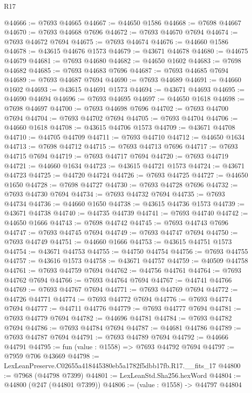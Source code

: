 \begin{lexlean}{R17}
\begin{coremodule}
@44666 := @7693 @44665
@44667 := @44650 @1586
@44668 := @7698 @44667
@44670 := @7693 @44668 @7696
@44672 := @7693 @44670 @7694
@44674 := @7693 @44672 @7694
@44675 := @7693 @44674
@44676 := @44660 @1586
@44678 := @43615 @44676 @1573
@44679 := @43671 @44678
@44680 := @44675 @44679
@44681 := @7693 @44680
@44682 := @44650 @1602
@44683 := @7698 @44682
@44685 := @7693 @44683 @7696
@44687 := @7693 @44685 @7694
@44689 := @7693 @44687 @7694
@44690 := @7693 @44689
@44691 := @44660 @1602
@44693 := @43615 @44691 @1573
@44694 := @43671 @44693
@44695 := @44690 @44694
@44696 := @7693 @44695
@44697 := @44650 @1618
@44698 := @7698 @44697
@44700 := @7693 @44698 @7696
@44702 := @7693 @44700 @7694
@44704 := @7693 @44702 @7694
@44705 := @7693 @44704
@44706 := @44660 @1618
@44708 := @43615 @44706 @1573
@44709 := @43671 @44708
@44710 := @44705 @44709
@44711 := @7693 @44710
@44712 := @44650 @1634
@44713 := @7698 @44712
@44715 := @7693 @44713 @7696
@44717 := @7693 @44715 @7694
@44719 := @7693 @44717 @7694
@44720 := @7693 @44719
@44721 := @44660 @1634
@44723 := @43615 @44721 @1573
@44724 := @43671 @44723
@44725 := @44720 @44724
@44726 := @7693 @44725
@44727 := @44650 @1650
@44728 := @7698 @44727
@44730 := @7693 @44728 @7696
@44732 := @7693 @44730 @7694
@44734 := @7693 @44732 @7694
@44735 := @7693 @44734
@44736 := @44660 @1650
@44738 := @43615 @44736 @1573
@44739 := @43671 @44738
@44740 := @44735 @44739
@44741 := @7693 @44740
@44742 := @44650 @1666
@44743 := @7698 @44742
@44745 := @7693 @44743 @7696
@44747 := @7693 @44745 @7694
@44749 := @7693 @44747 @7694
@44750 := @7693 @44749
@44751 := @44660 @1666
@44753 := @43615 @44751 @1573
@44754 := @43671 @44753
@44755 := @44750 @44754
@44756 := @7693 @44755
@44757 := @43616 @1573
@44758 := @43671 @44757
@44759 := @40509 @44758
@44761 := @7693 @44759 @7694
@44762 := @44756 @44761
@44764 := @7693 @44762 @7694
@44766 := @7693 @44764 @7694
@44767 := @44741 @44766
@44769 := @7693 @44767 @7694
@44771 := @7693 @44769 @7694
@44772 := @44726 @44771
@44774 := @7693 @44772 @7694
@44776 := @7693 @44774 @7694
@44777 := @44711 @44776
@44779 := @7693 @44777 @7694
@44781 := @7693 @44779 @7694
@44782 := @44696 @44781
@44784 := @7693 @44782 @7694
@44786 := @7693 @44784 @7694
@44787 := @44681 @44786
@44789 := @7693 @44787 @7694
@44791 := @7693 @44789 @7694
@44792 := @44666 @44791
@44795 := fun (value : @1558) => @7693 @44792 @7694
@44797 := @7959 @706 @43669
@44798 := LexLeanPreserve.C02655a418445380eb5a1782f5dbb17fb.R17.__fits_17
@44800 := @7968 (@44798 @7399)
@44801 := LexLeanStd.Sha256.hexWord
@44804 := @44800 (@247 (@44801 @7399))
@44806 := (value : @1558) -> @44797 @44804

\end{coremodule}
\end{lexlean}
